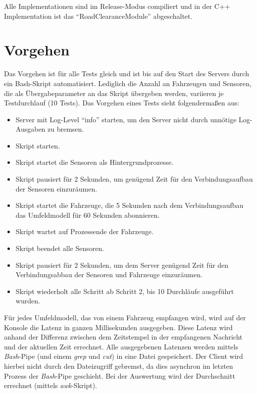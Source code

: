 Alle Implementationen sind im Release-Modus compiliert und in der C++ Implementation ist das \enquote{RoadClearanceModule} abgeschaltet.

\section{Vorgehen}
\label{eval:howto}

Das Vorgehen ist für alle Tests gleich und ist bis auf den Start des Servers durch ein Bash-Skript automatisiert.
Lediglich die Anzahl an Fahrzeugen und Sensoren, die als Übergabeparameter an das Skript übergeben werden, variieren je Testdurchlauf (10 Tests).
Das Vorgehen eines Tests sieht folgendermaßen aus:

\begin{itemize}
	\item Server mit Log-Level \enquote{info} starten, um den Server nicht durch unnötige Log-Ausgaben zu bremsen.
	\item Skript starten.
	\item Skript startet die Sensoren als Hintergrundprozesse.
	\item Skript pausiert für 2 Sekunden, um genügend Zeit für den Verbindungsaufbau der Sensoren einzuräumen.
	\item Skript startet die Fahrzeuge, die 5 Sekunden nach dem Verbindungsaufbau das Umfeldmodell für 60 Sekunden abonnieren.
	\item Skript wartet auf Prozessende der Fahrzeuge.
	\item Skript beendet alle Sensoren.
	\item Skript pausiert für 2 Sekunden, um dem Server genügend Zeit für den Verbindungsabbau der Sensoren und Fahrzeuge einzuräumen.
	\item Skript wiederholt alle Schritt ab Schritt 2, bis 10 Durchläufe ausgeführt wurden.
\end{itemize}

Für jedes Umfeldmodell, das von einem Fahrzeug empfangen wird, wird auf der Konsole die Latenz in ganzen Millisekunden ausgegeben.
Diese Latenz wird anhand der Differenz zwischen dem Zeitstempel in der empfangenen Nachricht und der aktuellen Zeit errechnet.
Alle ausgegebenen Latenzen werden mittels \textit{Bash}-Pipe (und einem \textit{grep} und \textit{cut}) in eine Datei gespeichert.
Der Client wird hierbei nicht durch den Dateizugriff gebremst, da dies asynchron im letzten Prozess der \textit{Bash}-Pipe geschieht.
Bei der Auswertung wird der Durchschnitt errechnet (mittels \textit{awk}-Skript).

